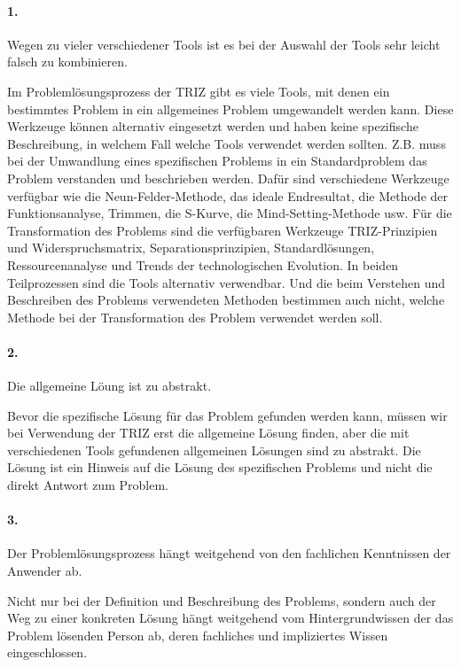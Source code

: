 \documentclass[11pt,a4paper]{article}
\begin{document}
\paragraph{1.}
Wegen zu vieler verschiedener Tools ist es bei der Auswahl der Tools sehr
leicht falsch zu kombinieren.

Im Problemlösungsprozess der TRIZ gibt es viele Tools, mit denen ein
bestimmtes Problem in ein allgemeines Problem umgewandelt werden kann. Diese
Werkzeuge können alternativ eingesetzt werden und haben keine spezifische
Beschreibung, in welchem Fall welche Tools verwendet werden sollten. Z.B.
muss bei der Umwandlung eines spezifischen Problems in ein Standardproblem das
Problem verstanden und beschrieben werden. Dafür sind verschiedene Werkzeuge
verfügbar wie die Neun-Felder-Methode, das ideale Endresultat, die Methode der
Funktionsanalyse, Trimmen, die S-Kurve, die Mind-Setting-Methode usw. Für die
Transformation des Problems sind die verfügbaren Werkzeuge TRIZ-Prinzipien und
Widerspruchsmatrix, Separationsprinzipien, Standardlösungen, Ressourcenanalyse
und Trends der technologischen Evolution. In beiden Teilprozessen sind die
Tools alternativ verwendbar. Und die beim Verstehen und Beschreiben des
Problems verwendeten Methoden bestimmen auch nicht, welche Methode bei der
Transformation des Problem verwendet werden soll.

\paragraph{2.}
Die allgemeine Löung ist zu abstrakt.

Bevor die spezifische Lösung für das Problem gefunden werden kann, müssen wir
bei Verwendung der TRIZ erst die allgemeine Lösung finden, aber die mit
verschiedenen Tools gefundenen allgemeinen Lösungen sind zu abstrakt. Die
Lösung ist ein Hinweis auf die Lösung des spezifischen Problems und nicht die
direkt Antwort zum Problem.

\paragraph{3.}
Der Problemlösungsprozess hängt weitgehend von den fachlichen Kenntnissen der
Anwender ab.

Nicht nur bei der Definition und Beschreibung des Problems, sondern auch der
Weg zu einer konkreten Lösung hängt weitgehend vom Hintergrundwissen der das
Problem lösenden Person ab, deren fachliches und impliziertes Wissen
eingeschlossen.
\end{document}

